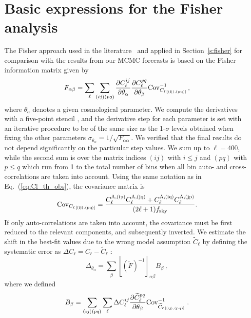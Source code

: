 \chapter{Basic expressions for the Fisher analysis}
\label{appendix2-mnu}

The Fisher approach used in the literature~\cite{Namikawa:2011yr,Duncan:2013haa,Camera:2014sba,Raccanelli:2015vla} and applied in Section~\ref{s:fisher} for comparison with the results from our MCMC forecasts is based on the Fisher information matrix given by
\begin{equation}
F_{\alpha\beta} =
\sum_{\ell} \sum_{(ij)(pq)} \frac{\partial C_\ell^{ij}}{\partial \theta_\alpha}
\frac{\partial C_\ell^{pq}}{\partial
\theta_\beta} {{\rm Cov}_{C_{\ell \, \rm[(ij), (pq)]}}^{-1}} \, ,
\label{eq:Fisher}
\end{equation}
where $\theta_a$ denotes a given cosmological parameter.
We compute the derivatives with a five-point stencil \cite{Montanari:2015rga}, and the derivative step for each parameter is set with an iterative procedure to be of the same size as the 1-$\sigma$ levels obtained when fixing the other parameters $\sigma_{\theta_{\alpha}}=1/\sqrt{F_{\alpha\alpha}}$.
We verified that the final results do not depend significantly on the particular step values.
We sum up to $\ell=400$, while the second sum is over the matrix indices $(ij)$ with $i \leq j$ and $(pq)$ with $p \leq q$ which run from 1 to the total number of bins when all bin auto- and cross-correlations are taken into account.
Using the same notation as in Eq.~(\ref{eq:Cl_th_obs}), the covariance matrix is
\begin{equation}
\label{eq:err-clgt}
{\rm Cov}_{C_{\ell \, \rm[(ij), (pq)]}} = \frac{C^{\rm A, (ip)}_{\ell} C^{\rm A, (jq)}_{\ell} + C^{\rm A, (iq)}_{\ell} C^{\rm A, (jp)}_{\ell}}{(2\ell+1)f_{\rm sky}}.
\end{equation}
If only auto-correlations are taken into account, the covariance must be first reduced to the relevant components, and subsequently inverted.
We estimate the shift in the best-fit values due to the wrong model assumption $\widetilde{C}_{\ell}$ by defining the systematic error as $\Delta C_{\ell}=C_{\ell}-\widetilde{C}_{\ell}$ \cite{Knox:1998fp,Heavens:2007ka,Kitching:2008eq,Camera:2014sba}:
\begin{equation}
\label{eq:shift}
\Delta_{\theta_{\alpha}}=\sum_{\beta} \left[\left(\widetilde{F}\right)^{-1}\right]_{\alpha\beta} B_{\beta} \;,
\end{equation}
where we defined
\begin{equation}
B_{\beta} = \sum_{(ij)(pq)} \sum_{\ell} \Delta C_{\ell}^{ ij} \frac{\partial \widetilde{C}_{\ell}^{pq}}{\partial \theta_{\beta}} {\rm Cov}_{\widetilde{C}_{\ell \, \rm[(ij), (pq)]}}^{-1} \;.
\end{equation}
